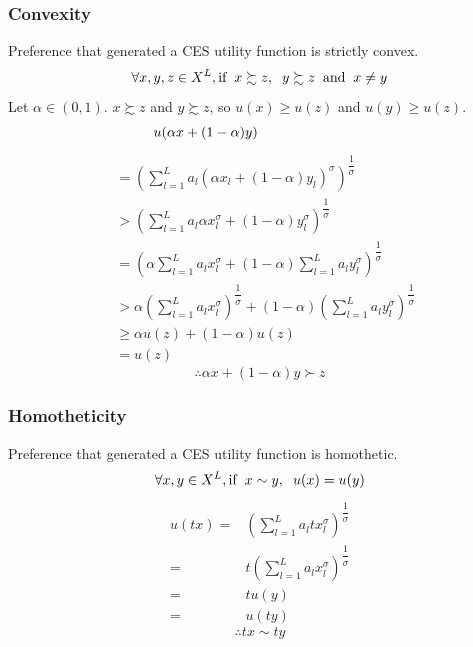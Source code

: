 \subsubsection{Convexity}
Preference that generated a CES utility function is strictly convex.
$$\forall x, y,z \in X^L, \text{if} \hspace*{2mm} x\succsim z,  \hspace*{2mm} y\succsim z \hspace*{2mm} \text{and} \hspace*{2mm} x\neq y$$
Let $\alpha \in (0,1)$. $ x\succsim z$ and $y\succsim z$, so $u(x)\geq u(z)$ and $u(y)\geq u(z)$.
\vspace*{1mm}
$$u(\alpha x+(1-\alpha)y)  \hspace*{27mm}$$
\vspace*{-10mm}
\begin{align*}
&= \left(\sum_{l=1}^{L}a_l(\alpha x_l+(1-\alpha)y_l)^\sigma\right)^{\dfrac{1}{\sigma}} \\
& >  \left(\sum_{l=1}^{L}a_l\alpha x_l^\sigma+(1-\alpha)y_l^\sigma\right)^{\dfrac{1}{\sigma}}\\
&= \left(\alpha\sum_{l=1}^{L}a_l x_l^\sigma+(1-\alpha)\sum_{l=1}^{L}a_l y_l^\sigma\right)^{\dfrac{1}{\sigma}}\\
& > \alpha\left(\sum_{l=1}^{L}a_l x_l^\sigma\right)^{\dfrac{1}{\sigma}}+(1-\alpha)\left(\sum_{l=1}^{L}a_l y_l^\sigma\right)^{\dfrac{1}{\sigma}}\\
& \geq \alpha u(z)+(1-\alpha) u(z)\\
&=u(z)
\end{align*}
$$\therefore \alpha x+(1-\alpha)y \succ z$$
\subsubsection{Homotheticity}
Preference that generated a CES utility function is homothetic.
$$\forall x, y \in X^L, \text{if} \hspace*{2mm} x\sim y,  \hspace*{2mm} u(x)=u(y) $$
\begin{align*}
u(tx) =& \left(\sum_{l=1}^{L}a_ltx_l^\sigma\right)^{\dfrac{1}{\sigma}}\\
      =& t\left(\sum_{l=1}^{L}a_lx_l^\sigma\right)^{\dfrac{1}{\sigma}}\\
      =& tu(y)\\
      =&u(ty)
\end{align*}
$$\therefore tx\sim ty$$
